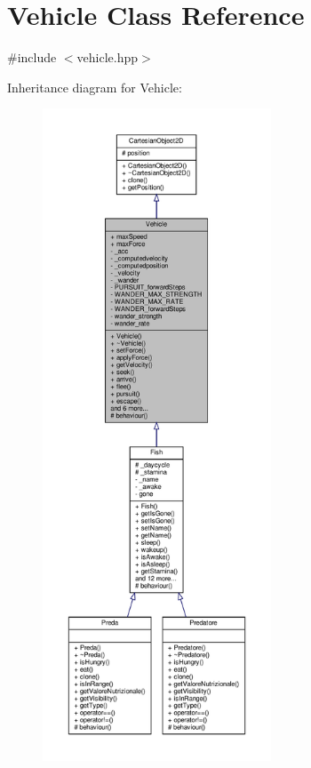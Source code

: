 \hypertarget{classVehicle}{}\section{Vehicle Class Reference}
\label{classVehicle}


{\ttfamily \#include $<$vehicle.\+hpp$>$}



Inheritance diagram for Vehicle\+:\nopagebreak
\begin{figure}[H]
\begin{center}
\leavevmode
\includegraphics[height=550pt]{classVehicle__inherit__graph}
\end{center}
\end{figure}



